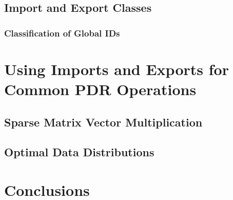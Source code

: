 \documentclass[12pt,relax]{PetraObjectModel}
\begin{document}
\subsection{Import and Export Classes}

\subsubsection{Classification of Global IDs}


\section{Using Imports and Exports for Common PDR Operations}

\subsection{Sparse Matrix Vector Multiplication}

\subsection{Optimal Data Distributions}

\section{Conclusions}


%
\clearpage


\end{document}
